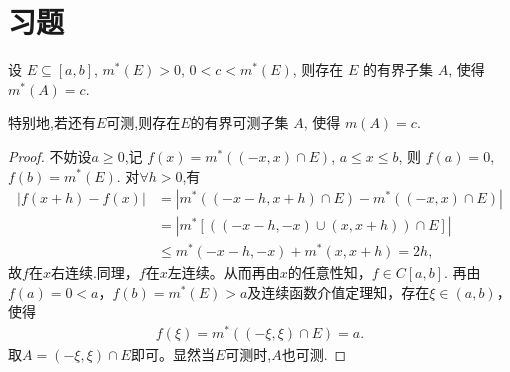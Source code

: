 \documentclass[../../main.tex]{subfiles}%
\begin{document}
\section{习题}

\begin{proposition}\label{proposition:Lebesgue外测度的内介值性}
设 \(E \subseteq [a,b]\), \(m^*(E)>0\), \(0 < c < m^*(E)\), 则存在 \(E\) 的有界子集 \(A\), 使得 \(m^*(A)=c\).

特别地,若还有$E$可测,则存在\(E\)的有界可测子集 \(A\), 使得 \(m(A)=c\).
\end{proposition}
\begin{proof}

不妨设$a\geqslant 0$,记 \(f(x)=m^*((-x,x) \cap E)\), \(a \leqslant  x \leqslant  b\), 则 \(f(a)=0\), \(f(b)=m^*(E)\). 对$\forall h>0$,有
\begin{align*}
\left| f\left( x+h \right) -f\left( x \right) \right|&=\left| m^*\left( \left( -x-h,x+h \right) \cap E \right) -m^*\left( \left( -x,x \right) \cap E \right) \right|\\
&=\left| m^*\left[ \left( \left( -x-h,-x \right) \cup \left( x,x+h \right) \right) \cap E \right] \right|\\
&\leqslant m^*\left( -x-h,-x \right) +m^*\left( x,x+h \right) =2h,
\end{align*}
故$f$在$x$右连续.同理，$f$在$x$左连续。从而再由$x$的任意性知，$f\in C\left[ a,b \right]$.
再由$f\left( a \right) =0<a$，$f\left( b \right) =m^*\left( E \right) >a$及连续函数介值定理知，存在$\xi \in \left( a,b \right)$，使得
\begin{align*}
f\left( \xi \right) =m^*\left( \left( -\xi ,\xi \right) \cap E \right) =a.
\end{align*}
取$A=\left( -\xi ,\xi \right) \cap E$即可。显然当$E$可测时,$A$也可测.

\end{proof}
\end{document}

